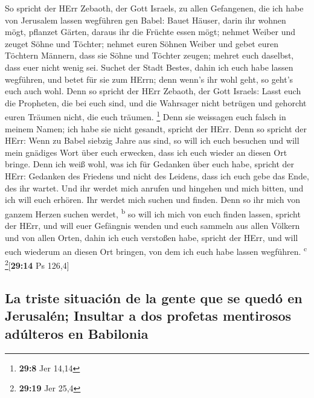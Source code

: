  So spricht der HErr Zebaoth, der Gott Israels, zu allen
Gefangenen, die ich habe von Jerusalem lassen wegführen gen Babel:
 Bauet Häuser, darin ihr wohnen mögt, pflanzet Gärten,
daraus ihr die Früchte essen mögt;  nehmet Weiber und
zeuget Söhne und Töchter; nehmet euren Söhnen Weiber und gebet euren
Töchtern Männern, dass sie Söhne und Töchter zeugen; mehret euch
daselbst, dass euer nicht wenig sei.  Suchet der Stadt
Bestes, dahin ich euch habe lassen wegführen, und betet für sie zum
HErrn; denn wenn's ihr wohl geht, so geht's euch auch wohl.
 Denn so spricht der HErr Zebaoth, der Gott Israels: Lasst
euch die Propheten, die bei euch sind, und die Wahrsager nicht betrügen
und gehorcht euren Träumen nicht, die euch träumen. \footnote{\textbf{29:8}
  Jer 14,14}  Denn sie weissagen euch falsch in meinem
Namen; ich habe sie nicht gesandt, spricht der HErr. 
Denn so spricht der HErr: Wenn zu Babel siebzig Jahre aus sind, so will
ich euch besuchen und will mein gnädiges Wort über euch erwecken, dass
ich euch wieder an diesen Ort bringe.  Denn ich weiß
wohl, was ich für Gedanken über euch habe, spricht der HErr: Gedanken
des Friedens und nicht des Leidens, dass ich euch gebe das Ende, des ihr
wartet.  Und ihr werdet mich anrufen und hingehen und
mich bitten, und ich will euch erhören.  Ihr werdet mich
suchen und finden. Denn so ihr mich von ganzem Herzen suchen werdet,
\textsuperscript{b}  so will ich mich von euch finden
lassen, spricht der HErr, und will euer Gefängnis wenden und euch
sammeln aus allen Völkern und von allen Orten, dahin ich euch verstoßen
habe, spricht der HErr, und will euch wiederum an diesen Ort bringen,
von dem ich euch habe lassen wegführen. \textsuperscript{c}
\footnote{\textbf{29:19} Jer 25,4}{[}\textbf{29:14} Ps 126,4{]}

\hypertarget{la-triste-situaciuxf3n-de-la-gente-que-se-queduxf3-en-jerusaluxe9n-insultar-a-dos-profetas-mentirosos-aduxfalteros-en-babilonia}{%
\subsection{La triste situación de la gente que se quedó en Jerusalén;
Insultar a dos profetas mentirosos adúlteros en
Babilonia}\label{la-triste-situaciuxf3n-de-la-gente-que-se-queduxf3-en-jerusaluxe9n-insultar-a-dos-profetas-mentirosos-aduxfalteros-en-babilonia}}

